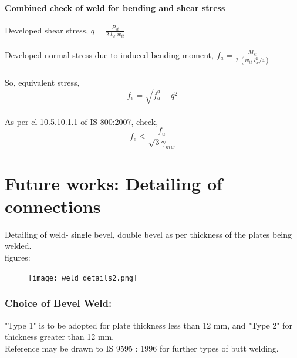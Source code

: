 \documentclass[11.5pt,a4paper,oneside]{report}
\begin{document}
\begin{Form}
\subsubsection{Combined check of weld for bending and shear stress}
Developed shear stress, $q = \frac{P_{st}}{2.l_w.w_{tt}}$\\
\\
Developed normal stress due to induced bending moment, $f_a = \frac{ M_{st}}{2.(w_{tt}.l_w^2/4)}$\\
\\
So, equivalent stress, 
\begin{equation}
f_e = \sqrt{f_a^2 + q^2}
\end{equation}
\\
As per cl 10.5.10.1.1 of IS 800:2007, check, 
\begin{equation}
f_e \leq \frac{f_u}{\sqrt{3} \gamma_{mw}}
\end{equation}



\chapter{Future works: Detailing of connections}
Detailing of weld- single bevel, double bevel as per thickness of the plates being welded.\\
figures:\\
\begin{figure}[ht]
	\centering
	\texttt{[image: weld\_details2.png]}
\end{figure}

\subsection{Choice of Bevel Weld:}
"Type 1" is to be adopted for plate thickness less than 12 mm, and "Type 2" for thickness greater than 12 mm.\\
Reference may be drawn to IS 9595 : 1996 for further types of butt welding.

\end{Form}
\end{document}
